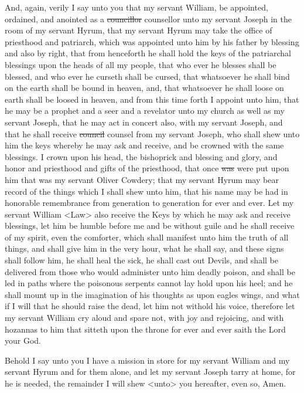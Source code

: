 				And, again, verily I say unto you that my servant William, be appointed, ordained, and anointed as a \sout{councillor} counsellor unto my servant Joseph in the room of my servant Hyrum, that my servant Hyrum may take the office of priesthood and patriarch, which was appointed unto him by his father by blessing and also by right, that from henceforth he shall hold the keys of the patriarchal blessings upon the heads of all my people, that who ever he blesses shall be blessed, and who ever he curseth shall be cursed, that whatsoever he shall bind on the earth shall be bound in heaven, and, that whatsoever he shall loose on earth shall be loosed in heaven, and from this time forth I appoint unto him, that he may be a prophet and a seer and a revelator unto my church as well as my servant Joseph, that he may act in concert also, with my servant Joseph, and that he shall receive \sout{council} counsel from my servant Joseph, who shall shew unto him the keys whereby he may ask and receive, and be crowned with the same blessings. I crown upon his head, the bishoprick and blessing and glory, and honor and priesthood and gifts of the priesthood, that once \sout{was} were put upon him that was my servant Oliver Cowdery; that my servant Hyrum may bear record of the things which I shall shew unto him, that his name may be had in honorable remembrance from generation to generation for ever and ever. Let my servant William <Law> also receive the Keys by which he may ask and receive blessings, let him be humble before me and be without guile and he shall receive of my spirit, even the comforter, which shall manifest unto him the truth of all things, and shall give him in the very hour, what he shall say, and these signs shall follow him, he shall heal the sick, he shall cast out Devils, and shall be delivered from those who would administer unto him deadly poison, and shall be led in paths where the poisonous serpents cannot lay hold upon his heel; and he shall mount up in the imagination of his thoughts as upon eagles wings, and what if I will that he should raise the dead, let him not withold his voice, therefore let my servant William cry aloud and spare not, with joy and rejoicing, and with hozannas to him that sitteth upon the throne for ever and ever saith the Lord your God.

				Behold I say unto you I have a mission in store for my servant William and my servant Hyrum and for them alone, and let my servant Joseph tarry at home, for he is needed, the remainder I will shew <unto> you hereafter, even so, Amen.

